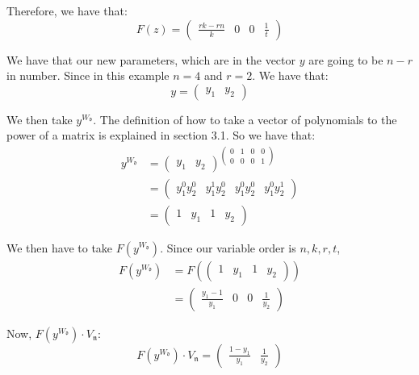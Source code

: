 \documentclass[oneside, a4paper, onecolumn, 11pt]{article}
\begin{document}
Therefore, we have that:
\[
    F(z) = \begin{pmatrix}
        \frac{rk - rn}{k} & 0 & 0 & \frac{1}{t}
    \end{pmatrix}
\]

We have that our new parameters, which are in the vector \(y\) are going to be \(n - r\) in number. Since in this example \(n = 4\) and \(r = 2\). We have that:
\[
    y = \begin{pmatrix}
        y_1 & y_2
    \end{pmatrix}
\]

We then take \(y^{W_{\mathfrak{d}}}\). The definition of how to take a vector of polynomials to the power of a matrix is explained in section 3.1. So we have that:
\begin{align*}
    y^{W_{\mathfrak{d}}}
     & = \begin{pmatrix}
             y_1 & y_2
         \end{pmatrix}^{
    \begin{pmatrix}
        0 & 1 & 0 & 0 \\
        0 & 0 & 0 & 1
    \end{pmatrix}}                                             \\
     & = \begin{pmatrix}
             y_1^0 y_2^0 & y_1^1 y_2^0 & y_1^0 y_2^0 & y_1^0 y_2^1
         \end{pmatrix} \\
     & = \begin{pmatrix}
             1 & y_1 & 1 & y_2
         \end{pmatrix}
\end{align*}

We then have to take \(F(y^{W_{\mathfrak{d}}})\). Since our variable order is \(n, k, r, t\),
\begin{align*}
    F(y^{W_{\mathfrak{d}}})
     & = F(\begin{pmatrix}
               1 & y_1 & 1 & y_2
           \end{pmatrix})                         \\
     & = \begin{pmatrix}
             \frac{y_1 - 1}{y_1} & 0 & 0 & \frac{1}{y_2}
         \end{pmatrix}
\end{align*}

Now, \(F(y^{W_{\mathfrak{d}}}) \cdot V_{\mathfrak{n}}\):
\[
    F(y^{W_{\mathfrak{d}}}) \cdot V_{\mathfrak{n}} =
    \begin{pmatrix}
        \frac{1 - y_1}{y_1} & \frac{1}{y_2}
    \end{pmatrix}
\]
\end{document}
